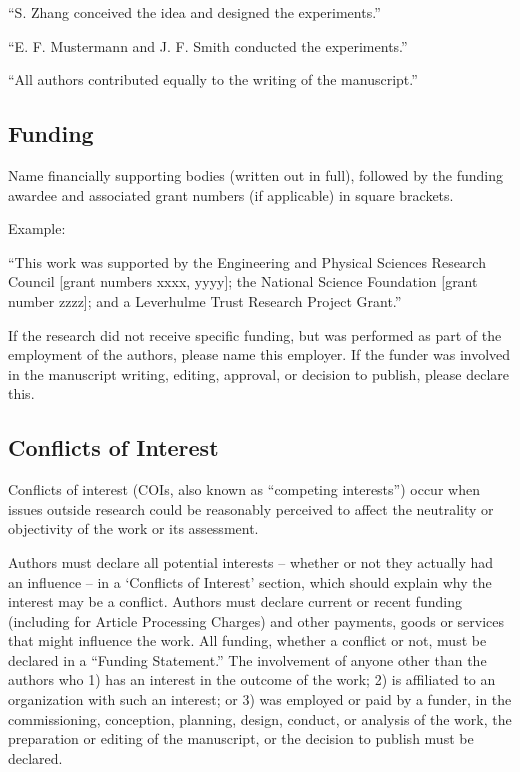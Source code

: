 \documentclass{article}
\begin{document}
``S. Zhang conceived the idea and designed the experiments.''

``E. F. Mustermann and J. F. Smith conducted the experiments.''

``All authors contributed equally to the writing of the manuscript.''

\subsection*{Funding}
Name financially supporting bodies (written out in full), followed by the funding awardee and associated grant numbers (if applicable) in square brackets. 

\medskip Example: 

``This work was supported by the Engineering and Physical Sciences Research Council [grant numbers xxxx, yyyy]; the National Science Foundation [grant number zzzz]; and a Leverhulme Trust Research Project Grant.'' 

\medskip
If the research did not receive specific funding, but was performed as part of the employment of the authors, please name this employer. If the funder was involved in the manuscript writing, editing, approval, or decision to publish, please declare this.

\subsection*{Conflicts of Interest}
Conflicts of interest (COIs, also known as ``competing interests'') occur when issues outside research could be reasonably perceived to affect the neutrality or objectivity of the work or its assessment. 

Authors must declare all potential interests – whether or not they actually had an influence – in a ‘Conflicts of Interest’ section, which should explain why the interest may be a conflict. Authors must declare current or recent funding (including for Article Processing Charges) and other payments, goods or services that might influence the work. All funding, whether a conflict or not, must be declared in a ``Funding Statement.'' The involvement of anyone other than the authors who 1) has an interest in the outcome of the work; 2) is affiliated to an organization with such an interest; or 3) was employed or paid by a funder, in the commissioning, conception, planning, design, conduct, or analysis of the work, the preparation or editing of the manuscript, or the decision to publish must be declared.
\end{document}
